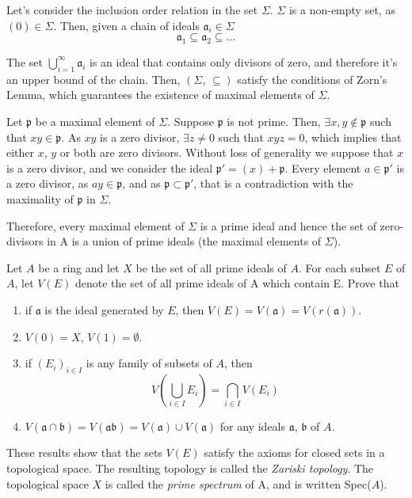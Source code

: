 \begin{sol}
	Let's consider the inclusion order relation in the set $\Sigma$. $\Sigma$ is a non-empty set, as $(0) \in \Sigma$. Then, given a chain of ideals $\mathfrak{a}_i \in \Sigma$
	\[
		\mathfrak{a}_1 \subseteq \mathfrak{a}_2 \subseteq \dots
	\]

	The set $\bigcup_{i=1}^\infty \mathfrak{a}_i$ is an ideal that contains only divisors of zero, and therefore it's an upper bound of the chain. Then, $(\Sigma, \, \subseteq)$ satisfy the conditions of Zorn's Lemma, which guarantees the existence of maximal elements of $\Sigma$.

	Let $\mathfrak{p}$ be a maximal element of $\Sigma$. Suppose $\mathfrak{p}$ is not prime. Then, $\exists x,y \notin \mathfrak{p}$ such that $xy \in \mathfrak{p}$. As $xy$ is a zero divisor, $\exists z \neq 0$ such that $xyz = 0$, which implies that either $x$, $y$ or both are zero divisors. Without loss of generality we suppose that $x$ is a zero divisor, and we consider the ideal $\mathfrak{p}' = (x) + \mathfrak{p}$. Every element $a \in \mathfrak{p}'$ is a zero divisor, as $ay \in \mathfrak{p}$, and as $\mathfrak{p} \subset \mathfrak{p}'$, that is a contradiction with the maximality of $\mathfrak{p}$ in $\Sigma$.

	Therefore, every maximal element of $\Sigma$ is a prime ideal and hence the set of zero-divisors in A is a union of prime ideals (the maximal elements of $\Sigma$).
\end{sol}

\begin{ex}
	Let $A$ be a ring and let $X$ be the set of all prime ideals of $A$. For each subset $E$ of $A$, let $V(E)$ denote the set of all prime ideals of A which contain E. Prove that
	\begin{enumerate}[label=(\roman*)]
		\item if $\mathfrak{a}$ is the ideal generated by $E$, then $V(E) = V(\mathfrak{a}) = V(r(\mathfrak{a}))$.
		\item $V(0) = X$, $V(1) = \emptyset$.
		\item if $(E_i)_{i \in I}$ is any family of subsets of $A$, then
			\[
				V \left ( \bigcup_{i \in I} E_i \right ) = \bigcap_{i \in I} V(E_i)
			\]
		\item $V(\mathfrak{a} \cap \mathfrak{b}) = V(\mathfrak{a}\mathfrak{b}) = V(\mathfrak{a}) \cup V(\mathfrak{a})$ for any ideals $\mathfrak{a}$, $\mathfrak{b}$ of $A$.
	\end{enumerate}

	These results show that the sets $V(E)$ satisfy the axioms for closed sets in a topological space. The resulting topology is called the \textit{Zariski topology}. The topological space $X$ is called the \textit{prime spectrum} of A, and is written Spec($A$).
\end{ex}


